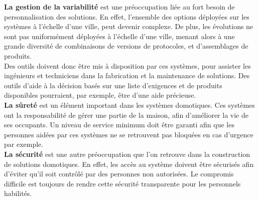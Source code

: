 {\bf La gestion de la variabilité} est une préoccupation liée au fort besoin de personnalisation des solutions. En effet, l'ensemble des options déployées sur les systèmes à l'échelle d'une ville, peut devenir complexe. De plus, les évolutions ne sont pas uniformément déployées à l'échelle d'une ville, menant alors à une grande diversité de combinaisons de versions de protocoles, et d'assemblages de produits.\\
Des outils doivent donc être mis à disposition par ces systèmes, pour assister les ingénieurs et techniciens dans la fabrication et la maintenance de solutions. Des outils d'aide à la décision basés sur une liste d'exigences et de produits disponibles pourraient, par exemple, être d'une aide précieuse.\\










{\bf La sûreté} est un élément important dans les systèmes domotiques. Ces systèmes ont la responsabilité de gérer une partie de la maison, afin d'améliorer la vie de ses occupants. Un niveau de service minimum doit être garanti afin que les personnes aidées par ces systèmes ne se retrouvent pas bloquées en cas d'urgence par exemple. \\

{\bf La sécurité} est une autre préoccupation que l'on retrouve dans la construction de solutions domotiques. En effet, les accès au système doivent être sécurisés afin d'éviter qu'il soit contrôlé par des personnes non autorisées. Le compromis difficile est toujours de rendre cette sécurité transparente pour les personnels habilités.\\


